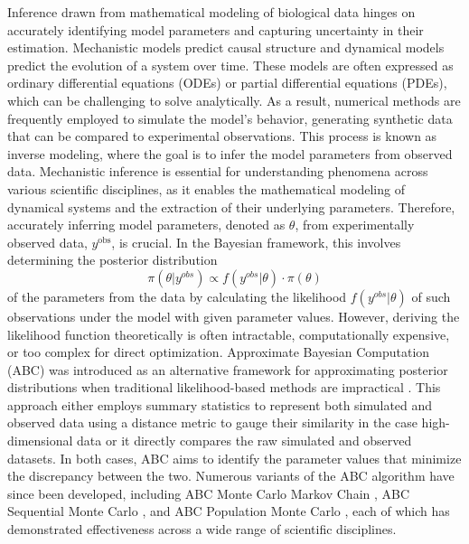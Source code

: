 \documentclass[12pt]{article} %
\begin{document}




Inference drawn from mathematical modeling of biological data hinges on accurately identifying model parameters and capturing uncertainty in their estimation.
Mechanistic models predict causal structure and dynamical models predict the evolution of a system over time. These models are often expressed as ordinary differential equations (ODEs) or partial differential equations (PDEs), which can be challenging to solve analytically. As a result, numerical methods are frequently employed to simulate the model's behavior, generating synthetic data that can be compared to experimental observations. This process is known as inverse modeling, where the goal is to infer the model parameters from observed data.
Mechanistic inference is essential for understanding phenomena across various scientific disciplines, as it enables the mathematical modeling of dynamical systems and the extraction of their underlying parameters. Therefore, accurately inferring model parameters, denoted as $\theta$, from experimentally observed data, $y^{\text{obs}}$, is crucial. In the Bayesian framework, this involves determining the posterior distribution
$$\pi(\theta | y^{obs}) \propto f(y^{obs} | \theta)\cdot \pi(\theta) $$
of the parameters from the data by calculating the likelihood $f(y^{obs} | \theta)$ of such observations under the model with given parameter values. However, deriving the likelihood function theoretically is often intractable, computationally expensive, or too complex for direct optimization. Approximate Bayesian Computation (ABC) was introduced as an alternative framework for approximating posterior distributions when traditional likelihood-based methods are impractical \citep{tavare1997inferring}. This approach either employs summary statistics to represent both simulated and observed data using a distance metric to gauge their similarity in the case high-dimensional data or it directly compares the raw simulated and observed datasets. In both cases, ABC aims to identify the parameter values that minimize the discrepancy between the two. Numerous variants of the ABC algorithm have since been developed, including ABC Monte Carlo Markov Chain \citep{marjoram2003markov}, ABC Sequential Monte Carlo \citep{toni2009approximate}, and ABC Population Monte Carlo \citep{robert2008adaptivity}, each of which has demonstrated effectiveness across a wide range of scientific disciplines.
\end{document}
